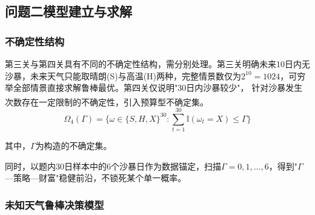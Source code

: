 \documentclass{cumcmthesis}
\numberwithin{equation}{section}
\numberwithin{figure}{section}
\numberwithin{table}{section}
\begin{document}
\vspace{-15pt}
\subsection{问题二模型建立与求解}

\subsubsection{不确定性结构}


第三关与第四关具有不同的不确定性结构，需分别处理。第三关明确未来10日内无沙暴，未来天气只能取晴朗(S)与高温(H)两种，完整情景数仅为$2^{10}=1024$，可穷举全部情景直接求解鲁棒最优。第四关仅说明"30日内沙暴较少"，
针对沙暴发生次数存在一定限制的不确定性，引入预算型不确定集\textsuperscript{\cite{shouyongyi2009}}。
\vspace{-8pt}
\begin{equation}
\Omega_4(\Gamma)=\bigl\{\omega\in\{S,H,X\}^{30} : \textstyle\sum_{t=1}^{30}\mathbb{I}(\omega_t=X)\le \Gamma\bigr\}
\label{eq:q2_omega4}
\end{equation}

其中，$\Gamma$为构造的不确定集。

同时，以题内30日样本中的6个沙暴日作为数据锚定，扫描$\Gamma=0,1,\dots,6$，得到"$\Gamma$—策略—财富"稳健前沿，不锁死某个单一概率。

 \vspace{-10pt} 
\subsubsection{未知天气鲁棒决策模型}
\end{document}

